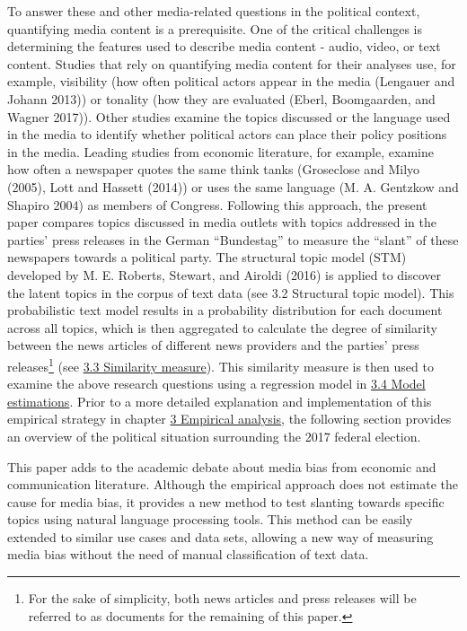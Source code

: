 \documentclass[
  12pt,
]{article}
\begin{document}
To answer these and other media-related questions in the political
context, quantifying media content is a prerequisite. One of the
critical challenges is determining the features used to describe media
content - audio, video, or text content. Studies that rely on
quantifying media content for their analyses use, for example,
visibility (how often political actors appear in the media (Lengauer and
Johann 2013)) or tonality (how they are evaluated (Eberl, Boomgaarden,
and Wagner 2017)). Other studies examine the topics discussed or the
language used in the media to identify whether political actors can
place their policy positions in the media. Leading studies from economic
literature, for example, examine how often a newspaper quotes the same
think tanks (Groseclose and Milyo (2005), Lott and Hassett (2014)) or
uses the same language (M. A. Gentzkow and Shapiro 2004) as members of
Congress. Following this approach, the present paper compares topics
discussed in media outlets with topics addressed in the parties' press
releases in the German ``Bundestag'' to measure the ``slant'' of these
newspapers towards a political party. The structural topic model (STM)
developed by M. E. Roberts, Stewart, and Airoldi (2016) is applied to
discover the latent topics in the corpus of text data (see
\protect\hypertarget{structural-topic-model}{}{3.2 Structural topic
model}). This probabilistic text model results in a probability
distribution for each document across all topics, which is then
aggregated to calculate the degree of similarity between the news
articles of different news providers and the parties' press
releases\footnote{For the sake of simplicity, both news articles and
  press releases will be referred to as documents for the remaining of
  this paper.} (see \protect\hyperlink{similarity-measure}{3.3
Similarity measure}). This similarity measure is then used to examine
the above research questions using a regression model in
\protect\hyperlink{model-estimations}{3.4 Model estimations}. Prior to a
more detailed explanation and implementation of this empirical strategy
in chapter \protect\hyperlink{empirical-analysis}{3 Empirical analysis},
the following section provides an overview of the political situation
surrounding the 2017 federal election.

This paper adds to the academic debate about media bias from economic
and communication literature. Although the empirical approach does not
estimate the cause for media bias, it provides a new method to test
slanting towards specific topics using natural language processing
tools. This method can be easily extended to similar use cases and data
sets, allowing a new way of measuring media bias without the need of
manual classification of text data.
\end{document}

